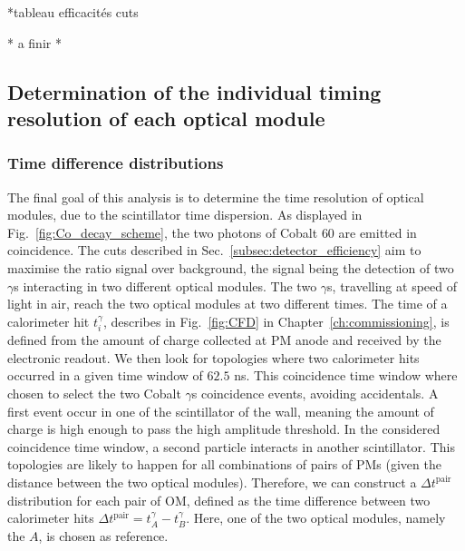 *tableau efficacités cuts






* a finir *

\subsection{Determination of the individual timing resolution of each optical module}


\subsubsection*{Time difference distributions}

The final goal of this analysis is to determine the time resolution of optical modules, due to the scintillator time dispersion.
As displayed in Fig.~\ref{fig:Co_decay_scheme}, the two photons of Cobalt $60$ are emitted in coincidence.
The cuts described in Sec.~\ref{subsec:detector_efficiency} aim to maximise the ratio signal over background, the signal being the detection of two $\gamma$s interacting in two different optical modules.
The two $\gamma$s, travelling at speed of light in air, reach the two optical modules at two different times.
The time of a calorimeter hit $t^{\gamma}_{i}$, describes in Fig.~\ref{fig:CFD} in Chapter~\ref{ch:commissioning}, is defined from the amount of charge collected at PM anode and received by the electronic readout.
We then look for topologies where two calorimeter hits occurred in a given time window of $62.5$ ns.
This coincidence time window where chosen to select the two Cobalt $\gamma$s coincidence events, avoiding accidentals.
A first event occur in one of the scintillator of the wall, meaning the amount of charge is high enough to pass the high amplitude threshold.
In the considered coincidence time window, a second particle interacts in another scintillator.
This topologies are likely to happen for all combinations of pairs of PMs (given the distance between the two optical modules).
Therefore, we can construct a $\Delta t^{\text{pair}}$ distribution for each pair of OM, defined as the time difference between two calorimeter hits $\Delta t^{\text{pair}} = t^{\gamma}_{A} - t^{\gamma}_{B}$.
Here, one of the two optical modules, namely the $A$, is chosen as reference.

